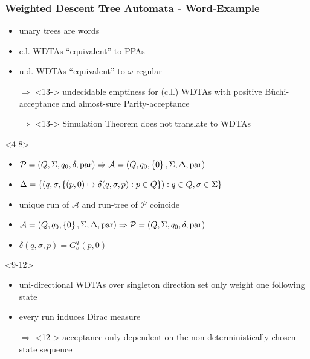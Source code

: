 \documentclass{beamer}
\begin{document}
  \begin{frame}
    \frametitle{Weighted Descent Tree Automata - Word-Example}
    \begin{itemize}
      \item<2-> unary trees are words
      \item<3-> c.l. \acp{WDTA} \enquote{equivalent} to \acp{PPA}
      \item<9-> u.d. \acp{WDTA} \enquote{equivalent} to $\omega$-regular
      \item[$\Rightarrow$]<13-> undecidable emptiness for (c.l.) \acp{WDTA}
        with positive Büchi-acceptance and almost-sure Parity-acceptance
      \item[$\Rightarrow$]<13-> Simulation Theorem does not translate to \acp{WDTA}
    \end{itemize}
    \begin{overlayarea}{\textwidth}{0.5\textheight}
      \begin{onlyenv}<4-8>
        \begin{itemize}
          \item<4-> $\mathcal{P} = \left(Q, \Sigma, q_{0}, \delta, \operatorname{par}\right)
            \Rightarrow \mathcal{A} = \left(Q, q_{0}, \left\{0\right\}, \Sigma, \Delta,
            \operatorname{par}\right)$
          \item<5-> $\Delta = \left\{\left(q, \sigma,
            \left\{\left(p,0\right)\mapsto\delta(q,\sigma,p):p\in Q\right\}\right): q\in Q,
            \sigma\in\Sigma\right\}$
          \item<8-> unique run of $\mathcal{A}$ and run-tree of $\mathcal{P}$
            coincide
          \item<6-> $\mathcal{A} = \left(Q, q_{0}, \left\{0\right\}, \Sigma, \Delta,
            \operatorname{par}\right)\Rightarrow\mathcal{P} = \left(Q, \Sigma, q_{0}, \delta,
            \operatorname{par}\right)$
          \item<7-> $\delta(q, \sigma, p) = G_{\sigma}^{q}(p, 0)$
        \end{itemize}
      \end{onlyenv}
      \begin{onlyenv}<9-12>
        \begin{itemize}
          \item<10-> uni-directional \acp{WDTA} over singleton direction set
            only weight one following state
          \item<11-> every run induces Dirac measure
          \item[$\Rightarrow$]<12-> acceptance only dependent on the
            non-deterministically chosen state sequence
        \end{itemize}
      \end{onlyenv}
    \end{overlayarea}
  \end{frame}
\end{document}
